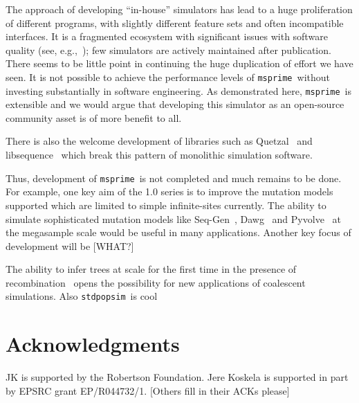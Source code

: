 \documentclass{article}
\newcommand{\msprime}[0]{\texttt{msprime}}
\newcommand{\stdpopsim}[0]{\texttt{stdpopsim}}
\begin{document}
The approach of developing ``in-house'' simulators
has lead to a huge proliferation of different programs, with
slightly different feature sets and often incompatible interfaces.
It is a fragmented ecosystem with significant issues with software
quality (see, e.g.,~\cite{yang2014critical});
few simulators are actively maintained after publication.
There seems to be little point
in continuing the huge duplication of effort we have seen.
It is not possible to achieve the performance levels of
\msprime\ without investing substantially in software engineering.
As demonstrated here, \msprime\ is extensible and we would argue
that developing this simulator as an open-source community asset
is of more benefit to all.

There is also the welcome development of libraries such as
Quetzal~\citep{becheler2019quetzal} and libsequence~\citep{thornton2014cpp}
which break this pattern of monolithic simulation software.


Thus, development of \msprime\ is not completed and much remains
to be done. For example, one key aim of the 1.0 series is to
improve the mutation models supported which are limited to
simple infinite-sites currently. The ability to simulate
sophisticated mutation models like Seq-Gen~\citep{rambaut1997seq},
Dawg~\citep{cartwright2005dna} and Pyvolve~\citep{spielman2015pyvolve} at the megasample scale would be
useful in many applications. Another key focus of development
will be [WHAT?]

The ability to infer trees at scale for the first time
in the presence of
recombination~\citep{harris2019database,kelleher2019inferring,
speidel2019method,tang2019genealogy}
opens the possibility for new applications of coalescent simulations.
Also \stdpopsim\ is cool~\citep{adrion2019community}

\section*{Acknowledgments}
JK is supported by the Robertson Foundation. 
Jere Koskela is supported in part by EPSRC grant EP/R044732/1.
[Others fill in their ACKs please]



\end{document}
